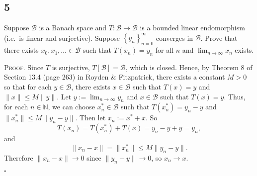 \documentclass[12pt]{article}
\newcounter{ProofCounter}
\newcounter{ClaimCounter}[ProofCounter]
\newenvironment{Proof}{\stepcounter{ProofCounter}\textsc{Proof.}}{\hfill$\square$}
\newenvironment{claim}[1]{\vspace{1mm}\stepcounter{ClaimCounter}\par\noindent\underline{\bf Claim \theClaimCounter:}\space#1}{}
\newenvironment{claimproof}[1]{\par\noindent\underline{Proof of claim \theClaimCounter:}\space#1}{\hfill $\blacksquare$ Claim \theClaimCounter}
\begin{document}
\subsection*{5}
\begin{tcolorbox}
  Suppose $\mathcal{B}$ is a Banach space and $T : \mathcal{B} \rightarrow \mathcal{B}$ is a bounded linear endomorphism (i.e.\ is linear %
  and surjective). Suppose $\left\{ y_n \right\}_{n=0}^{\infty}$ converges in $\mathcal{B}$. Prove that there exists $x_0, x_1, \hdots \in \mathcal{B}$
  such that $T(x_n) = y_n$ for all $n$ and $\lim_{n\rightarrow\infty}x_n$ exists.
\end{tcolorbox}
\begin{Proof}
  Since $T$ is surjective, $T[\mathcal{B}] = \mathcal{B}$, which is closed. Hence,
  by Theorem 8 of Section 13.4 (page 263) in Royden \& Fitzpatrick, there exists a constant $M > 0$ so that
  for each $y \in \mathcal{B}$, there exists $x \in \mathcal{B}$ such that $T(x) = y$ and $\|x\| \leq M\|y\|$. 
  Let $y := \lim_{n\rightarrow\infty}y_{n}$ and $x \in \mathcal{B}$ such that $T(x) = y$. 
  Thus, for each $n \in \mathbb{N}$, we can choose $x_{n}^{*} \in \mathcal{B}$ such that 
  $T(x_{n}^{*}) = y_n - y$ and $\|x_{n}^{*}\| \leq M\|y_n - y\|$. Then let $x_n := x^{*} + x$. So
  \[ T(x_n) = T(x_{n}^{*}) + T(x) = y_n - y + y = y_n, \]
  and 
  \[ \|x_n - x\| = \|x_{n}^{*}\| \leq M\|y_n - y\|. \]
  Therefore $\|x_n - x\| \rightarrow 0$ since $\|y_n - y\| \rightarrow 0$, so $x_n \rightarrow x$.

  

\end{Proof}
\end{document}
